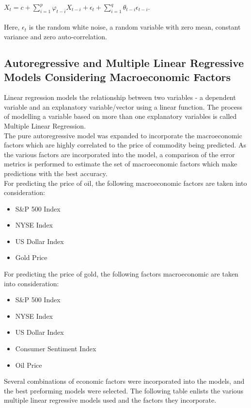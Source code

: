 \documentclass[runningheads]{llncs}
\begin{document}
$ X_{t} = c + \sum\limits_{i=1}^p \varphi_{t-i}X_{t-i} + \epsilon_{t} + \sum\limits_{i=1}^q \theta_{t-i}\epsilon_{t-i}$.\\\\

\noindent Here, $\epsilon_t$ is the random white noise, a random variable with zero mean, constant variance and zero auto-correlation. \\


\subsection{Autoregressive and Multiple Linear Regressive Models Considering Macroeconomic Factors}
Linear regression models the relationship between two variables - a dependent variable and an explanatory variable/vector using a linear function. The process of modelling a variable based on more than one explanatory variables is called Multiple Linear Regression. \\
   
\noindent The pure autoregressive model was expanded to incorporate the macroeconomic factors which are highly correlated to the price of commodity being predicted. As the various factors are incorporated into the model, a comparison of the error metrics is performed to estimate the set of macroeconomic factors which make predictions with the best accuracy. \\


\noindent For predicting the price of oil, the following macroeconomic factors are taken into consideration:
\begin {itemize}
\item S\&P 500 Index
\item NYSE Index
\item US Dollar Index
\item Gold Price
\end {itemize}

\noindent For predicting the price of gold, the following factors macroeconomic are taken into consideration:
\begin {itemize}
\item S\&P 500 Index
\item NYSE Index
\item US Dollar Index
\item Consumer Sentiment Index
\item Oil Price
\end {itemize}

\noindent Several combinations of economic factors were incorporated into the models, and the best preforming models were selected. The following table enlists the various multiple linear regressive models used and the factors they incorporate.
\end{document}

